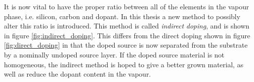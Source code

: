 It is now vital to have the proper ratio between all of the elements in the vapour phase, i.e. silicon, carbon and dopant. In this thesis a new method to possibly alter this ratio is introduced. This method is called \emph{indirect doping}, and is shown in figure \ref{fig:indirect_doping}. This differs from the direct doping shown in figure \ref{fig:direct_doping} in that the doped source is now separated from the substrate by a nominally undoped source layer. If the doped source material is not homogeneous, the indirect method is hoped to give a better grown material, as well as reduce the dopant content in the vapour. 

	





 
 

 
 

 


 
 
 
 
 
 
 
 
 
 
 
 
 
 
 
 
 
 
 
 
 
 
 
 
 
 
 
 
 
 
 
 
 
 
 
 
 
 
 
 
 
 
 